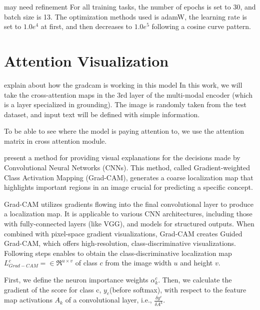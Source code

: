 
{\color{red} may need refinement}
For all training tasks, the number of epochs is set to 30, and batch size is 13. The optimization methods used is adamW, the learning rate is set to $1.0e^4$ at first, and then decreases to $1.0e^5$ following a cosine curve pattern.


\section{Attention Visualization}

{\color{red} explain about how the gradcam is working in this model}
In this work, we will take the cross-attention maps in the 3rd layer of the multi-modal encoder (which is a layer specialized in grounding). The image is randomly taken from the test dataset, and input text will be defined with simple information.

To be able to see where the model is paying attention to, we use the attention matrix in cross attention module. 

\cite{gradcam} present a method for providing visual explanations for the decisions made by Convolutional Neural Networks (CNNs). This method, called Gradient-weighted Class Activation Mapping (Grad-CAM), generates a coarse localization map that highlights important regions in an image crucial for predicting a specific concept.

Grad-CAM utilizes gradients flowing into the final convolutional layer to produce a localization map. It is applicable to various CNN architectures, including those with fully-connected layers (like VGG), and models for structured outputs. When combined with pixel-space gradient visualizations, Grad-CAM creates Guided Grad-CAM, which offers high-resolution, class-discriminative visualizations.
Following steps enables to obtain the class-discriminative localization map $L^c_{Grad-CAM} = \in\Re^{u \times v}$ of class $c$ from the image width $u$ and height $v$. 

First, we define the neuron importance weights $\alpha^c_k$. Then, we calculate the gradient of the score for class c, $y_c$(before softmax), with respect to the feature map activations $A_k$ of a convolutional layer, i.e., $\frac{\delta y^c}{\delta A^k}$. 
 
